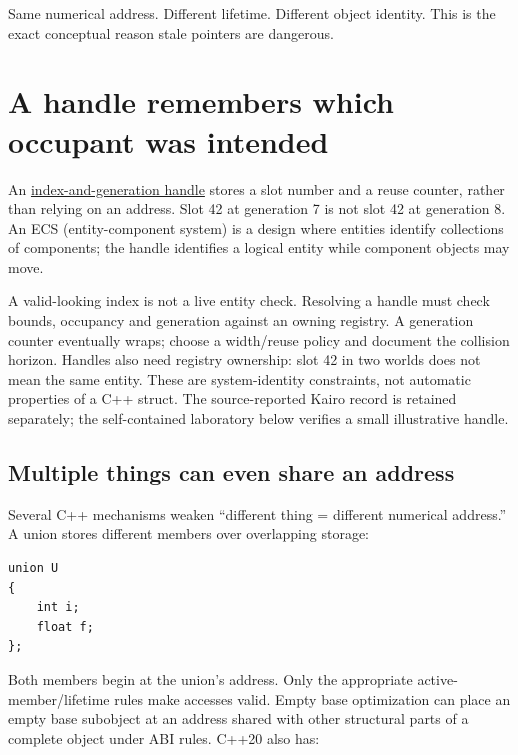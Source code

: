 Same numerical address. Different lifetime. Different object identity. This is the exact conceptual reason stale pointers are dangerous.

\section{A handle remembers which occupant was intended}\label{01-foundations-i-ch002-a-handle-remembers-which-occupant-was-intended}

\hypertarget{01-foundations-i-ch002-a-handle-remembers-which-occupant-was-intended}{}

An \hyperref[appendix-f1581457d322]{index-and-generation handle} stores a slot number and a reuse counter, rather than relying on an address. Slot 42 at generation 7 is not slot 42 at generation 8. An ECS (entity-component system) is a design where entities identify collections of components; the handle identifies a logical entity while component objects may move.

A valid-looking index is not a live entity check. Resolving a handle must check bounds, occupancy and generation against an owning registry. A generation counter eventually wraps; choose a width/reuse policy and document the collision horizon. Handles also need registry ownership: slot 42 in two worlds does not mean the same entity. These are system-identity constraints, not automatic properties of a C++ struct. The source-reported Kairo record is retained separately; the self-contained laboratory below verifies a small illustrative handle.

\subsection{Multiple things can even share an address}\label{01-foundations-i-ch002-multiple-things-can-even-share-an-address}

\hypertarget{01-foundations-i-ch002-multiple-things-can-even-share-an-address}{}

Several C++ mechanisms weaken ``different thing = different numerical address.'' A union stores different members over overlapping storage:

\begin{verbatim}
union U
{
    int i;
    float f;
};
\end{verbatim}

Both members begin at the union's address. Only the appropriate active-member/lifetime rules make accesses valid. Empty base optimization can place an empty base subobject at an address shared with other structural parts of a complete object under ABI rules. C++20 also has:

